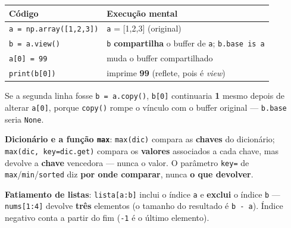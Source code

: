\begin{exemplo}
\begin{center}
\begin{tabular}{@{}p{5.4cm}p{5.4cm}@{}}
\toprule
\textbf{Código} & \textbf{Execução mental} \\
\midrule
\texttt{a = np.array([1,2,3])} & \texttt{a} = [1,2,3] (original) \\
\texttt{b = a.view()} & \texttt{b} \textbf{compartilha} o buffer de
\texttt{a}; \texttt{b.base is a} \\
\texttt{a[0] = 99} & muda o buffer compartilhado \\
\texttt{print(b[0])} & imprime \textbf{99} (reflete, pois é \textit{view}) \\
\bottomrule
\end{tabular}
\end{center}

Se a segunda linha fosse \texttt{b = a.copy()}, \texttt{b[0]} continuaria
\textbf{1} mesmo depois de alterar \texttt{a[0]}, porque \texttt{copy()}
rompe o vínculo com o buffer original --- \texttt{b.base} seria
\texttt{None}.
\end{exemplo}

\textbf{Dicionário e a função \texttt{max}}: \texttt{max(dic)} compara as
\textbf{chaves} do dicionário; \texttt{max(dic, key=dic.get)} compara os
\textbf{valores} associados a cada chave, mas devolve a \textbf{chave}
vencedora --- nunca o valor. O parâmetro \texttt{key=} de
\texttt{max}/\texttt{min}/\texttt{sorted} diz \textbf{por onde comparar},
nunca \textbf{o que devolver}.

\textbf{Fatiamento de listas}: \texttt{lista[a:b]} inclui o índice
\texttt{a} e \textbf{exclui} o índice \texttt{b} --- \texttt{nums[1:4]}
devolve \textbf{três} elementos (o tamanho do resultado é \texttt{b - a}).
Índice negativo conta a partir do fim (\texttt{-1} é o último elemento).
